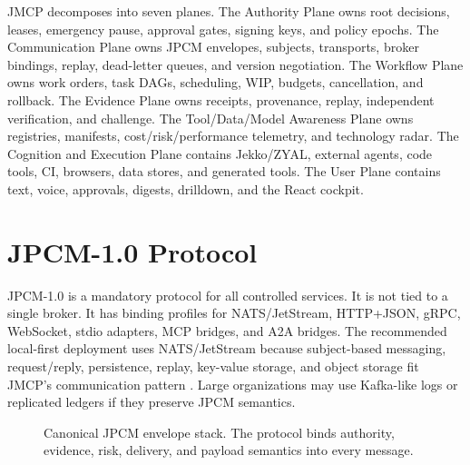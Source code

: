 \documentclass[journal,onecolumn]{IEEEtran}
\begin{document}
JMCP decomposes into seven planes. The Authority Plane owns root decisions, leases, emergency pause, approval gates, signing keys, and policy epochs. The Communication Plane owns JPCM envelopes, subjects, transports, broker bindings, replay, dead-letter queues, and version negotiation. The Workflow Plane owns work orders, task DAGs, scheduling, WIP, budgets, cancellation, and rollback. The Evidence Plane owns receipts, provenance, replay, independent verification, and challenge. The Tool/Data/Model Awareness Plane owns registries, manifests, cost/risk/performance telemetry, and technology radar. The Cognition and Execution Plane contains Jekko/ZYAL, external agents, code tools, CI, browsers, data stores, and generated tools. The User Plane contains text, voice, approvals, digests, drilldown, and the React cockpit.

\section{JPCM-1.0 Protocol}
JPCM-1.0 is a mandatory protocol for all controlled services. It is not tied to a single broker. It has binding profiles for NATS/JetStream, HTTP+JSON, gRPC, WebSocket, stdio adapters, MCP bridges, and A2A bridges. The recommended local-first deployment uses NATS/JetStream because subject-based messaging, request/reply, persistence, replay, key-value storage, and object storage fit JMCP's communication pattern \cite{nats,jetstream}. Large organizations may use Kafka-like logs or replicated ledgers if they preserve JPCM semantics.

\begin{figure}[t]
\centering
{}
\caption{Canonical JPCM envelope stack. The protocol binds authority, evidence, risk, delivery, and payload semantics into every message.}
\end{figure}
\end{document}
